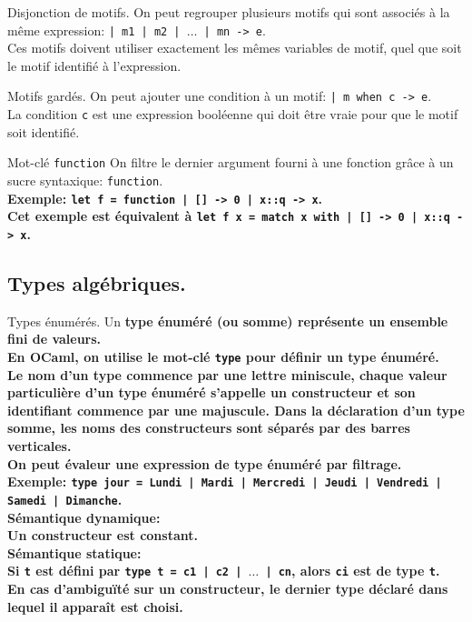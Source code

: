 \documentclass[french, 11pt]{article}
\begin{document}
\begin{defi}{Disjonction de motifs.}{}
    On peut regrouper plusieurs motifs qui sont associés à la même expression: \texttt{| m1 | m2 | $\dots$ | mn -> e}.\\
    Ces motifs doivent utiliser exactement les mêmes variables de motif, quel que soit le motif identifié à l'expression.
\end{defi}

\begin{defi}{Motifs gardés.}{}
    On peut ajouter une condition à un motif: \texttt{| m when c -> e}.\\
    La condition \texttt{c} est une expression booléenne qui doit être vraie pour que le motif soit identifié.
\end{defi}

\begin{defi}{Mot-clé \texttt{function}}{}
    On filtre le dernier argument fourni à une fonction grâce à un sucre syntaxique: \texttt{function}.\\
    \bf{Exemple:} \texttt{let f = function | [] -> 0 | x::q -> x}.\\
    Cet exemple est équivalent à \texttt{let f x = match x with | [] -> 0 | x::q -> x}.
\end{defi}

\subsection{Types algébriques.}

\begin{defi}{Types énumérés.}{}
    Un \bf{type énuméré} (ou somme) représente un ensemble fini de valeurs.\\
    En OCaml, on utilise le mot-clé \texttt{type} pour définir un type énuméré.\\
    Le nom d'un type commence par une lettre miniscule, chaque valeur particulière d'un type énuméré s'appelle un constructeur et son identifiant commence par une majuscule. Dans la déclaration d'un type somme, les noms des constructeurs sont séparés par des barres verticales.\\
    On peut évaleur une expression de type énuméré par filtrage.\\
    \bf{Exemple:} \texttt{type jour = Lundi | Mardi | Mercredi | Jeudi | Vendredi | Samedi | Dimanche}.\\
    \bf{Sémantique dynamique:}\\
    Un constructeur est constant.\\
    \bf{Sémantique statique:}\\
    Si \texttt{t} est défini par \texttt{type t = c1 | c2 | $\dots$ | cn}, alors \texttt{ci} est de type \texttt{t}.\\
    En cas d'ambiguïté sur un constructeur, le dernier type déclaré dans lequel il apparaît est choisi. 
\end{defi}
\end{document}
